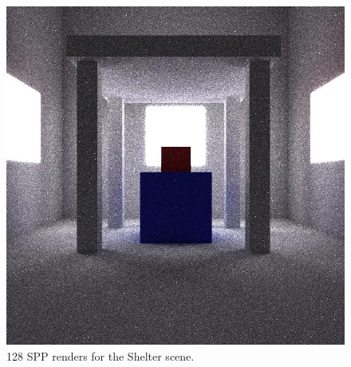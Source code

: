 \documentclass[ %
                    author={Callum Pearce},
                supervisor={Dr. Neill Campbell},
                    degree={MEng},
                     title={Learning the incident radiance for a continuous state space rather than a discrete one is more beneficial for Importance Sampling in Monte Carlo Path Tracing},
                  subtitle={},
                      type={research},
                      year={2019} ]{dissertation}
\begin{document}
\begin{figure}[h]
\endminipage\hspace{1em}
  \includegraphics[width=\textwidth]{images/renders/shelter/nn.png}
\endminipage
\caption{128 SPP renders for the Shelter scene.}
\label{fig:shelter}
\end{figure}
\end{document}
